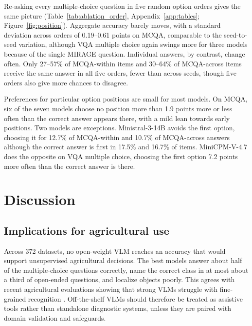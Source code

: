 \documentclass[10pt,letterpaper]{article}
\begin{document}
Re-asking every multiple-choice question in five random option orders gives the same picture (Table~\ref{tab:ablation_order}, Appendix~\ref{app:tables}; Figure~\ref{fig:position}). Aggregate accuracy barely moves, with a standard deviation across orders of 0.19--0.61 points on MCQA, comparable to the seed-to-seed variation, although VQA multiple choice again swings more for three models because of the single MIRAGE question. Individual answers, by contrast, change often. Only 27--57\% of MCQA-within items and 30--64\% of MCQA-across items receive the same answer in all five orders, fewer than across seeds, though five orders also give more chances to disagree.

Preferences for particular option positions are small for most models. On MCQA, six of the seven models choose no position more than 1.9 points more or less often than the correct answer appears there, with a mild lean towards early positions. Two models are exceptions. Ministral-3-14B avoids the first option, choosing it for 12.7\% of MCQA-within and 10.7\% of MCQA-across answers although the correct answer is first in 17.5\% and 16.7\% of items. MiniCPM-V-4.7 does the opposite on VQA multiple choice, choosing the first option 7.2 points more often than the correct answer is there.

\section{Discussion}
\label{sec:discussion}

\subsection{Implications for agricultural use}
Across 372 datasets, no open-weight VLM reaches an accuracy that would support unsupervised agricultural decisions. The best models answer about half of the multiple-choice questions correctly, name the correct class in at most about a third of open-ended questions, and localize objects poorly. This agrees with recent agricultural evaluations showing that strong VLMs struggle with fine-grained recognition \cite{arshad_leveraging_2025, shinoda_agrobench_2025}. Off-the-shelf VLMs should therefore be treated as assistive tools rather than standalone diagnostic systems, unless they are paired with domain validation and safeguards.
\end{document}
